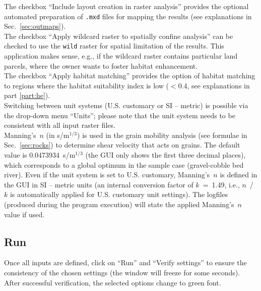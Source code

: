 The checkbox ``Include layout creation in raster analysis'' provides the optional automated preparation of \texttt{.mxd} files for mapping the results (see explanations in Sec.~\ref{sec:outmaps}).\\
The checkbox ``Apply wildcard raster to spatially confine analysis'' can be checked to use the \texttt{wild} raster for spatial limitation of the results. This application makes sense, e.g., if the wildcard raster contains particular land parcels, where the owner wants to foster habitat enhancement.\\
The checkbox ``Apply habitat matching'' provides the option of habitat matching to regions where the habitat suitability index is low ($<$0.4, see explanations in part \ref{part:he}).\\
Switching between unit systems (U.S. customary or SI -- metric) is possible via the drop-down menu ``Units''; please note that the unit system needs to be consistent with all input raster files.\\

Manning's~$n$ (in s/m$^{1/3}$) is used in the grain mobility analysis (see formulae in Sec.~\ref{sec:rocks}) to determine shear velocity that acts on grains. The default value is 0.0473934~s/m$^{1/3}$ (the GUI only shows the first three decimal places), which corresponds to a global optimum in the sample case (gravel-cobble bed river). Even if the unit system is set to U.S. customary, Manning's~$n$ is defined in the GUI in SI -- metric units (an internal conversion factor of $k$~=~1.49, i.e., $n$~/~$k$ is automatically applied for U.S. customary unit settings). The logfiles (produced during the program execution) will state the applied Manning's~$n$ value if used.

\subsection{Run}

Once all inputs are defined, click on ``Run'' and ``Verify settings'' to ensure the consistency of the chosen settings (the window will freeze for some seconds). After successful verification, the selected options change to green font.\\

